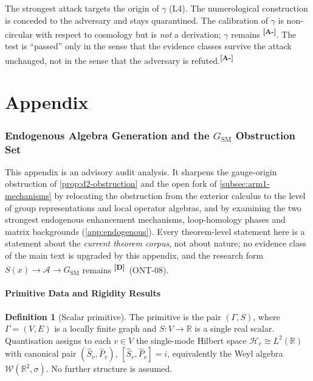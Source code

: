 \documentclass[12pt,a4paper,twoside]{article}
\theoremstyle{plain}
\theoremstyle{definition}
\newtheorem{definition}[theorem]{Definition}
\theoremstyle{remark}
\newcommand{\catmark}[1]{\textsuperscript{\textsf{\textbf{[#1]}}}}
\begin{document}
\begin{governancebox}
The strongest attack targets the origin of $\gamma$ (L4). The numerological construction is conceded to the adversary and stays quarantined. The calibration of $\gamma$ is non-circular with respect to cosmology but is \emph{not} a derivation; $\gamma$ remains \catmark{A-}. The test is ``passed'' only in the sense that the evidence classes survive the attack unchanged, not in the sense that the adversary is refuted.\catmark{A-}
\end{governancebox}

\appendix
\part*{Appendix}

\section{Endogenous Algebra Generation and the $G_{\mathrm{SM}}$ Obstruction Set}
\label{app:insertion-points}

\begin{governancebox}
This appendix is an advisory audit analysis. It sharpens the gauge-origin
obstruction of \cref{prop:d2-obstruction} and the open fork of
\cref{subsec:arm1-mechanisms} by relocating the obstruction from the exterior
calculus to the level of group representations and local operator algebras,
and by examining the two strongest endogenous enhancement mechanisms,
loop-homology phases and matrix backgrounds (\cref{app:endogenous}).
Every theorem-level statement here is a statement about the \emph{current
theorem corpus}, not about nature; no evidence class of the main text is
upgraded by this appendix, and the research form
$S(x)\to\mathcal{A}\to G_{\mathrm{SM}}$ remains \catmark{D}\ (ONT-08).
\end{governancebox}

\subsection{Primitive Data and Rigidity Results}
\label{app:rigidity}

\begin{definition}[Scalar primitive]
\label{def:scalar-primitive}
The primitive is the pair $(\Gamma, S)$, where $\Gamma=(V,E)$ is a locally
finite graph and $S:V\to\mathbb{R}$ is a single real scalar. Quantisation
assigns to each $v\in V$ the single-mode Hilbert space
$\mathcal{H}_v \cong L^2(\mathbb{R})$ with canonical pair
$(\hat S_v,\hat P_v)$, $[\hat S_v,\hat P_v]=i$, equivalently the Weyl algebra
$\mathcal{W}(\mathbb{R}^2,\sigma)$. No further structure is assumed.
\end{definition}
\end{document}
